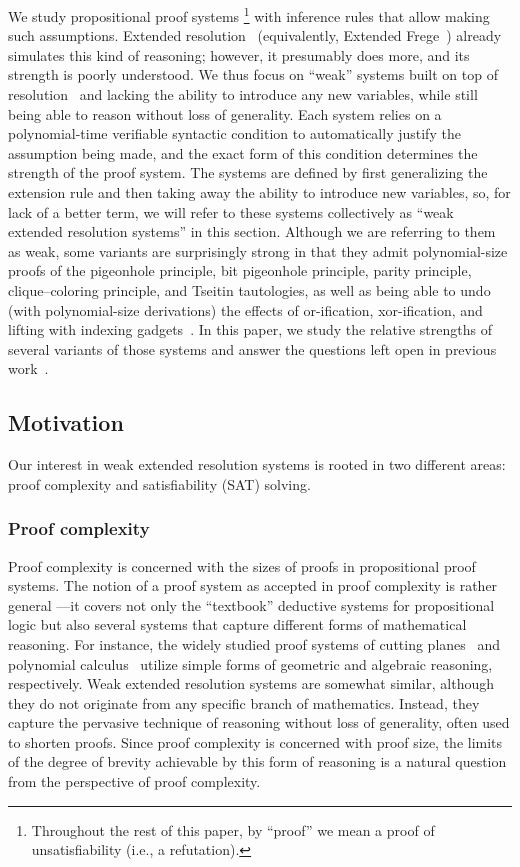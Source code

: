 \documentclass[12pt]{article}
\begin{document}
We study propositional proof systems%
\footnote{Throughout the rest of this paper, by ``proof''
  we mean a proof of unsatisfiability (i.e., a refutation).}
with inference rules that allow making such assumptions.
Extended resolution~\cite{Tse68}
(equivalently, Extended Frege~\cite{CR79})
already simulates this kind of reasoning;
however, it presumably does more,
and its strength is poorly understood.
We thus focus on ``weak'' systems
built on top of resolution~\cite{Bla37,Rob65}
and lacking the ability to introduce any new variables,
while still being able to reason without loss of generality.
Each system relies on a polynomial-time verifiable syntactic condition
to automatically justify the assumption being made,
and the exact form of this condition
determines the strength of the proof system.
The systems are defined by first generalizing the extension rule
and then taking away the ability to introduce new variables,
so, for lack of a better term, we will refer to these systems
collectively as ``weak extended resolution systems'' in this section.
Although we are referring to them as weak,
some variants are surprisingly strong in that they admit
polynomial-size proofs of the pigeonhole principle,
bit pigeonhole principle, parity principle,
clique--coloring principle, and Tseitin tautologies,
as well as being able to undo (with polynomial-size derivations)
the effects of or-ification, xor-ification,
and lifting with indexing gadgets~\cite{BT21}.
In this paper, we study the relative strengths
of several variants of those systems
and answer the questions left open in previous work~\cite[Section~1.4]{YH23}.

\subsection{Motivation}
\label{sec:motivation}

Our interest in weak extended resolution systems
is rooted in two different areas:
proof complexity and satisfiability (SAT) solving.

\subsubsection{Proof complexity}
\label{sec:proof-complexity}

Proof complexity is concerned with the sizes of proofs in propositional proof systems.
The notion of a proof system as accepted in proof complexity is rather general%
---it covers not only the ``textbook'' deductive systems for propositional logic
but also several systems that capture different forms of mathematical reasoning.
For instance, the widely studied proof systems of
cutting planes~\cite{CCT87} and polynomial calculus~\cite{CEI96}
utilize simple forms of geometric and algebraic reasoning, respectively.
Weak extended resolution systems are somewhat similar,
although they do not originate from any specific branch of mathematics.
Instead, they capture the pervasive technique of
reasoning without loss of generality, often used to shorten proofs.
Since proof complexity is concerned with proof size,
the limits of the degree of brevity achievable by this form of reasoning
is a natural question from the perspective of proof complexity.
\end{document}
